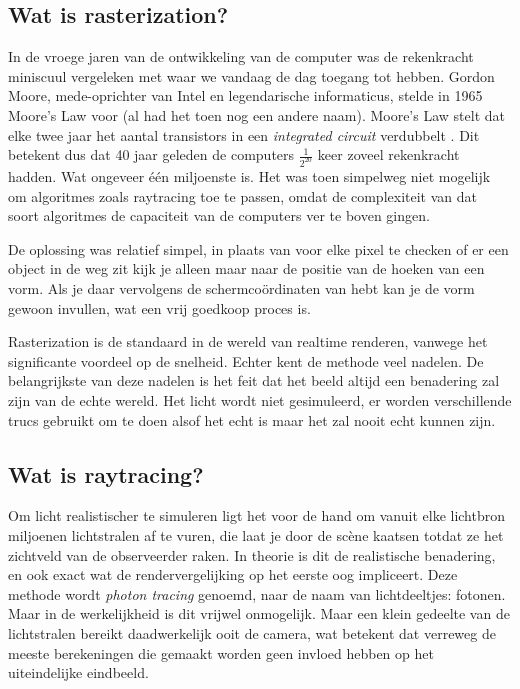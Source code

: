 \documentclass[12pt, a4paper]{article}
\begin{document}
\subsection{Wat is rasterization?}
In de vroege jaren van de ontwikkeling van de computer was de rekenkracht miniscuul vergeleken met waar we vandaag de dag toegang tot hebben. Gordon Moore, mede-oprichter van Intel en legendarische informaticus, stelde in 1965 Moore's Law voor (al had het toen nog een andere naam). Moore's Law stelt dat elke twee jaar het aantal transistors in een \emph{integrated circuit} verdubbelt \cite{CrammingComponents}. Dit betekent dus dat 40 jaar geleden de computers \(\frac{1}{2^{20}}\) keer zoveel rekenkracht hadden. Wat ongeveer één miljoenste is. Het was toen simpelweg niet mogelijk om algoritmes zoals raytracing toe te passen, omdat de complexiteit van dat soort algoritmes de capaciteit van de computers ver te boven gingen.

De oplossing was relatief simpel, in plaats van voor elke pixel te checken of er een object in de weg zit kijk je alleen maar naar de positie van de hoeken van een vorm. Als je daar vervolgens de schermcoördinaten van hebt kan je de vorm gewoon invullen, wat een vrij goedkoop proces is.

Rasterization is de standaard in de wereld van realtime renderen, vanwege het significante voordeel op de snelheid. Echter kent de methode veel nadelen. De belangrijkste van deze nadelen is het feit dat het beeld altijd een benadering zal zijn van de echte wereld. Het licht wordt niet gesimuleerd, er worden verschillende trucs gebruikt om te doen alsof het echt is maar het zal nooit echt kunnen zijn. 
\subsection{Wat is raytracing?}

Om licht realistischer te simuleren ligt het voor de hand om vanuit elke lichtbron miljoenen lichtstralen af te vuren, die laat je door de scène kaatsen totdat ze het zichtveld van de observeerder raken. In theorie is dit de realistische benadering, en ook exact wat de rendervergelijking op het eerste oog impliceert. Deze methode wordt \emph{photon tracing} genoemd, naar de naam van lichtdeeltjes: fotonen. Maar in de werkelijkheid is dit vrijwel onmogelijk. Maar een klein gedeelte van de lichtstralen bereikt daadwerkelijk ooit de camera, wat betekent dat verreweg de meeste berekeningen die gemaakt worden geen invloed hebben op het uiteindelijke eindbeeld. 
\end{document}
